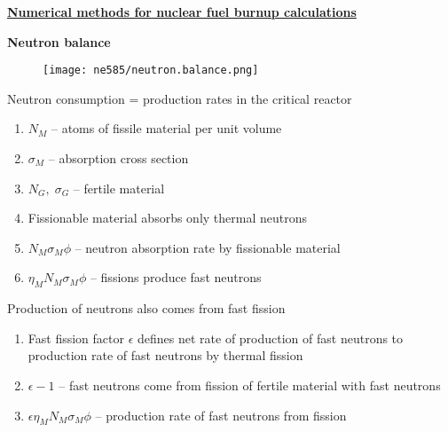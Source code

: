 \documentclass[aspectratio=1610,pdftex,dvipsnames,compress,xcolor={dvipsnames}]{beamer}
\begin{document}
\begin{frame}[plain]{}
    \centering\textbf{\href{https://serpent.vtt.fi/serpent/download/S32.pdf}{Numerical methods for nuclear fuel burnup calculations}}
\end{frame}


\begin{frame}[plain]{}
    \centering\LARGE\textbf{Neutron balance}
\end{frame}


\addtocounter{framenumber}{-2} 
\begin{frame}{}
    \begin{figure}
        \centering
        \texttt{[image: ne585/neutron.balance.png]}
    \end{figure}
\end{frame}


\begin{frame}{Neutron consumption = production rates in the critical reactor}
    \begin{enumerate}[series=outerlist,topsep=0pt,itemsep=21pt,leftmargin=*,label=(\arabic*)]
        \item[]$N_M$ -- atoms of fissile material per unit volume
        \item[]$\sigma_M$ -- absorption cross section
        \item[]$N_G, \; \sigma_G$ -- fertile material
        \item[]Fissionable material absorbs only thermal neutrons
        \item[]$N_M\sigma_M\phi$ -- neutron absorption rate by fissionable material
        \item[]$\eta_M N_M\sigma_M\phi$ -- fissions produce fast neutrons
    \end{enumerate}
\end{frame}


\begin{frame}{Production of neutrons also comes from fast fission}
    \begin{enumerate}[series=outerlist,topsep=0pt,itemsep=21pt,leftmargin=*,label=(\arabic*)]
        \item[]Fast fission factor $\epsilon$ defines net rate of production of fast neutrons to production rate of fast neutrons by thermal fission
        \item[]$\epsilon - 1$ -- fast neutrons come from fission of fertile material with fast neutrons
        \item[]$\epsilon\eta_M N_M \sigma_M \phi$ -- production rate of fast neutrons from fission
    \end{enumerate}
\end{frame}
\end{document}
